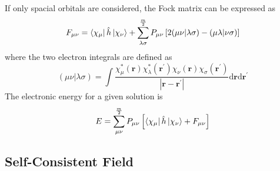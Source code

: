 \documentclass[final,3p,times,twocolumn]{elsarticle}
\begin{document}
If only spacial orbitals are considered, the Fock matrix can be expressed as
\begin{equation} \label{eq:fockmatspace}
\begin{gathered}
F_{\mu\nu} = \bra{\chi_\mu} \hat h \ket{\chi_\nu} + \sum_{\lambda\sigma}^{\frac{m}{2}} P_{\mu\nu} \left[ 2(\mu\nu|\lambda\sigma) - (\mu\lambda|\nu\sigma)\right]
\end{gathered}
\end{equation} 
where the two electron integrals are defined as
\begin{equation} \label{eq:2e}
(\mu\nu|\lambda\sigma) = \int \frac{\chi_\mu^*(\mathbf{r})\chi_\lambda^*(\mathbf{r}^\prime)\chi_\nu(\mathbf{r})\chi_\sigma(\mathbf{r}^\prime)}{|\mathbf{r}-\mathbf{r}^\prime|} \mathrm{d}\mathbf{r}\mathrm{d}\mathbf{r}^\prime
\end{equation}
The electronic energy for a given solution is
\begin{equation} \label{eq:hfenergy}
E = \sum_{\mu\nu}^{\frac{m}{2}} P_{\mu\nu} \left[ \bra{\chi_\mu} \hat h \ket{\chi_\nu} + F_{\mu\nu} \right]
\end{equation}

% 
% 
% 
% 
% 
% 
% 
%
%

\subsection{Self-Consistent Field} \label{sec:scf}
\end{document}

